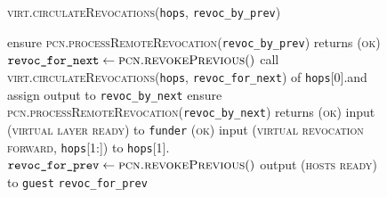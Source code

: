 \begin{figure}[H]
  \begin{processbox}{\textsc{virt.circulateRevocations}(\texttt{hops},
  \texttt{revoc\_by\_prev})}
    \begin{algorithmic}[1]
     
      \State ensure
      \textsc{pcn.processRemoteRevocation}(\texttt{revoc\_by\_prev}) returns
      (\textsc{ok})
    \Else \: 
      \State $\texttt{revoc\_for\_next} \gets \textsc{pcn.revokePrevious}()$
      \State call \textsc{virt.circulateRevocations}(\texttt{hops},
      \texttt{revoc\_for\_next}) of \texttt{hops}[0].\bob and assign output to
      \texttt{revoc\_by\_next}
      \State ensure
      \textsc{pcn.processRemoteRevocation}(\texttt{revoc\_by\_next}) returns
      (\textsc{ok})
      \State input (\textsc{virtual layer ready}) to \texttt{funder}
      \State {} 
      \State {}
      \State \Return (\textsc{ok})
    \EndIf
     
      \State input (\textsc{virtual revocation forward}, \texttt{hops}[1:]) to
      \texttt{hops}[1].\alice
      \State {}
      \State {}
      \State {}
      \State {}
    \EndIf
    \State $\texttt{revoc\_for\_prev} \gets \textsc{pcn.revokePrevious}()$
     
      \State output (\textsc{hosts ready}) to \texttt{guest}
      \State {} 
      \State {}
    \EndIf
    \State \Return \texttt{revoc\_for\_prev}
    \end{algorithmic}
  \end{processbox}
  \caption{}
  \label{code:virtual-layer:revocation}
\end{figure}

